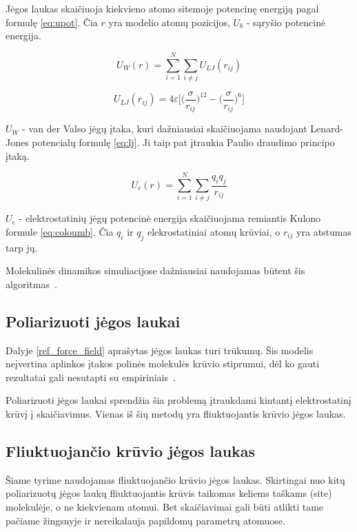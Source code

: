 \documentclass[runningheads]{llncs}
\begin{document}
Jėgos laukas skaičiuoja kiekvieno atomo sitemoje potencinę energiją pagal formulę \ref{eq:upot}.
Čia \(r\) yra modelio atomų pozicijos, \(U_b\) - sąryšio potencinė energija.

\begin{equation}
    U_W(r) = \sum\limits_{i=1}^N \sum\limits_{i\neq j} {U_{LJ}(r_{ij})}
\end{equation}

\begin{equation} \label{eq:lj}
    U_{LJ}(r_{ij}) = 4\varepsilon\Bigg[\bigg(\dfrac \sigma {r_{ij}}\bigg)^{12} - \bigg(\dfrac \sigma {r_{ij}}\bigg)^6\Bigg]
\end{equation}

\(U_W\) - van der Valso jėgų įtaka, kuri dažniausiai skaičiuojama naudojant Lenard-Jones potencialų formulę \ref{eq:lj}.
Ji taip pat įtraukia Paulio draudimo principo įtaką.

\begin{equation} \label{eq:coloumb}
    U_{e}(r) = \sum\limits_{i=1}^N \sum\limits_{i\neq j} {\dfrac{q_i q_j}{r_{ij}}}
\end{equation}

\(U_e\) - elektrostatinių jėgų potencinė energija skaičiuojama remiantis Kulono formule \ref{eq:coloumb}.
Čia \(q_i\) ir \(q_j\) elekrostatiniai atomų krūviai, o \(r_{ij}\) yra atstumas tarp jų.

Molekulinės dinamikos simuliacijose dažniausiai naudojamas būtent šis algoritmas~\cite{ref_pol}.


\subsection{Poliarizuoti jėgos laukai}

Dalyje \ref{ref_force_field} aprašytas jėgos laukas turi trūkumų.
Šis modelis neįvertina aplinkos įtakos polinės molekulės krūvio stiprumui, dėl ko gauti rezultatai gali nesutapti su empiriniais~\cite{ref_pol}.

Poliarizuoti jėgos laukai sprendžia šia problemą įtraukdami kintantį elektrostatinį krūvį į skaičiavimus.
Vienas iš šių metodų yra fliuktuojantis krūvio jėgos laukas.


\subsection{Fliuktuojančio krūvio jėgos laukas}

Šiame tyrime naudojamas fliuktuojančio krūvio jėgos laukas.
Skirtingai nuo kitų poliarizuotų jėgos laukų fliuktuojantis krūvis taikomas keliems taškams (site) molekulėje, o ne kiekvienam atomui.
Bet skaičiavimai gali būti atlikti tame pačiame žingsnyje ir nereikalauja papildomų parametrų atomuose.
\end{document}
